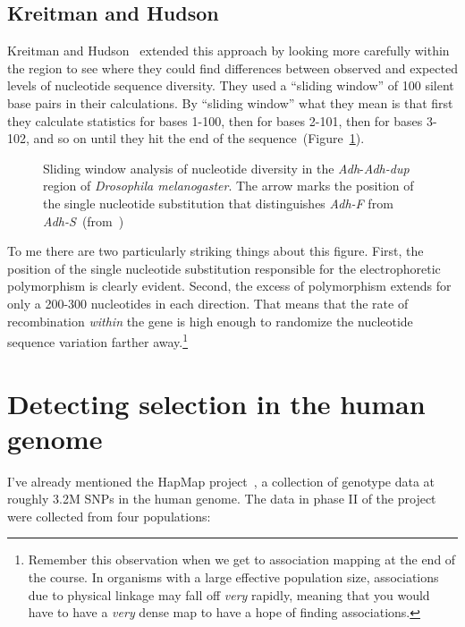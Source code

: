 \documentclass[12pt]{article}
\begin{document}
\subsection*{Kreitman and Hudson}

Kreitman and Hudson~\cite{Kreitman-Hudson91} extended this approach by
looking more carefully within the region to see where they could find
differences between observed and expected levels of nucleotide
sequence diversity. They used a ``sliding window'' of 100 silent base
pairs in their calculations. By ``sliding window'' what they mean is
that first they calculate statistics for bases 1-100, then for bases
2-101, then for bases 3-102, and so on until they hit the end of the
sequence~(Figure~\ref{fig:kh}).

\begin{figure}
\begin{center}
\end{center}
\caption{Sliding window analysis of nucleotide diversity in the {\it
    Adh\/}-{\it Adh-dup} region of {\it Drosophila melanogaster}. The
  arrow marks the position of the single nucleotide substitution that
  distinguishes {\it Adh-F\/} from {\it
    Adh-S\/}~(from~\cite{Kreitman-Hudson91})}\label{fig:kh}
\end{figure}

To me there are two particularly striking things about this
figure. First, the position of the single nucleotide substitution
responsible for the electrophoretic polymorphism is clearly
evident. Second, the excess of polymorphism extends for only a 200-300
nucleotides in each direction. That means that the rate of
recombination {\it within\/} the gene is high enough to randomize the
nucleotide sequence variation farther away.\footnote{Remember this
  observation when we get to association mapping at the end of the
  course. In organisms with a large effective population size,
  associations due to physical linkage may fall off {\it very\/}
  rapidly, meaning that you would have to have a {\it very\/} dense
  map to have a hope of finding associations.}

\section*{Detecting selection in the human genome}

I've already mentioned the HapMap project~\cite{HapMap-2007}, a
collection of genotype data at roughly 3.2M SNPs in the human
genome. The data in phase II of the project were collected from four
populations:
\end{document}
